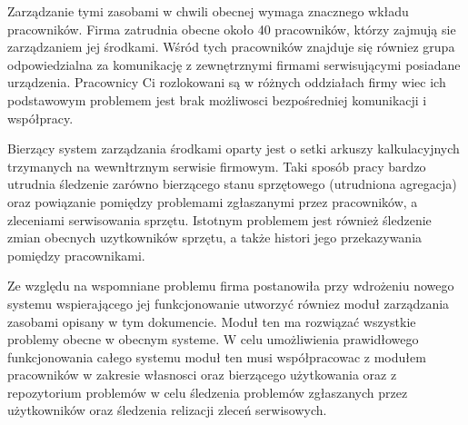 Zarządzanie tymi zasobami w chwili obecnej wymaga znacznego wkładu
pracowników. Firma zatrudnia obecne około 40 pracowników, którzy
zajmują sie zarządzaniem jej środkami. Wśród tych pracowników znajduje
się równiez grupa odpowiedzialna za komunikację z zewnętrznymi firmami
serwisującymi posiadane urządzenia. Pracownicy Ci rozlokowani są w
różnych oddziałach firmy wiec ich podstawowym problemem jest brak
możliwosci bezpośredniej komunikacji i współpracy.

Bierzący system zarządzania środkami oparty jest o setki arkuszy
kalkulacyjnych trzymanych na wewnłtrznym serwisie firmowym. Taki
sposób pracy bardzo utrudnia śledzenie zarówno bierzącego stanu
sprzętowego (utrudniona agregacja) oraz powiązanie pomiędzy problemami
zgłaszanymi przez pracowników, a zleceniami serwisowania
sprzętu. Istotnym problemem jest również śledzenie zmian obecnych
uzytkowników sprzętu, a także histori jego przekazywania pomiędzy
pracownikami.

Ze względu na wspomniane problemu firma postanowiła przy wdrożeniu
nowego systemu wspierającego jej funkcjonowanie utworzyć równiez moduł
zarządzania zasobami opisany w tym dokumencie. Moduł ten ma rozwiązać
wszystkie problemy obecne w obecnym systeme. W celu umożliwienia
prawidłowego funkcjonowania całego systemu moduł ten musi
współpracowac z modułem pracowników w zakresie własnosci oraz
bierzącego użytkowania oraz z repozytorium problemów w celu śledzenia
problemów zgłaszanych przez użytkowników oraz śledzenia relizacji
zleceń serwisowych.

